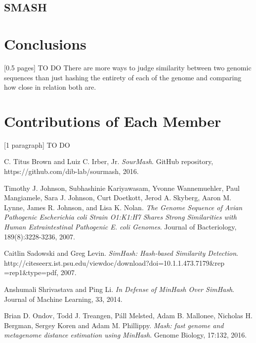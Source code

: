 \documentclass[12pt, letterpaper]{article}
\begin{document}
\subsection{SMASH}

\section{Conclusions}
[0.5 pages] \color{red} TO DO \color{black} There are more ways to judge similarity between two genomic sequences than just hashing the entirety of each of the genome and comparing how close in relation both are.

\section{Contributions of Each Member}
[1 paragraph] \color{red} TO DO \color{black}

\begin{thebibliography}{9}

  C. Titus Brown and Luiz C. Irber, Jr.
  \textit{SourMash}.
  GitHub repository, https://github.com/dib-lab/sourmash, 2016.
  
  Timothy J. Johnson, Subhashinie Kariyawasam, Yvonne Wannemuehler, Paul Mangiamele, Sara J. Johnson, Curt Doetkott, Jerod A. Skyberg, Aaron M. Lynne, James R. Johnson, and Lisa K. Nolan.
  \textit{The Genome Sequence of Avian Pathogenic Escherichia coli Strain O1:K1:H7 Shares Strong Similarities with Human Extraintestinal Pathogenic E. coli Genomes}.
  Journal of Bacteriology, 189(8):3228-3236, 2007.
  
  Caitlin Sadowski and Greg Levin.
  \textit{SimHash: Hash-based Similarity Detection}.
  http://citeseerx.ist.psu.edu/viewdoc/download?doi=10.1.1.473.7179\&rep\\=rep1\&type=pdf, 
  2007.

  Anshumali Shrivastava and Ping Li.
  \textit{In Defense of MinHash Over SimHash}.
  Journal of Machine Learning, 33, 2014.

  Brian D. Ondov, Todd J. Treangen, Páll Melsted, Adam B. Mallonee, Nicholas H. Bergman, Sergey Koren and Adam M. Phillippy.
  \textit{Mash: fast genome and metagenome distance estimation using MinHash}.
  Genome Biology, 17:132, 2016.

\end{thebibliography}
\end{document}
